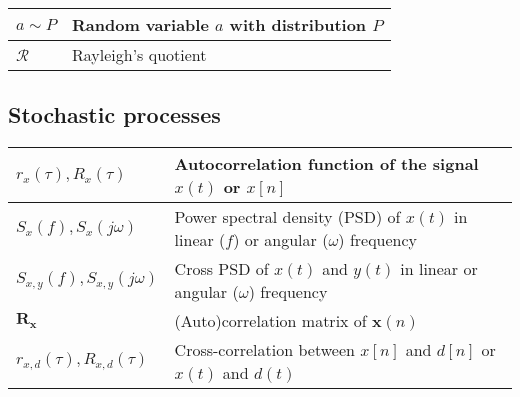 \begin{xltabular}{\textwidth}{XX}
	\(a\sim P\)                                                                                                                                  & Random variable \(a\) with distribution \(P\)                                                                                                                           \\ \hline
	\(\mathcal{R}\)                                                                                                                              & Rayleigh's quotient
\end{xltabular}
\subsection{Stochastic processes}
\begin{xltabular}{\textwidth}{XX}
	\(r_x(\tau), R_x(\tau)\)                                                                                                      & Autocorrelation function of the signal \(x(t)\) or \(x[n]\) \cite{nossekAdaptiveArraySignal2015}                                                                                                                                   \\ \hline
	\(S_x(f), S_x(j\omega)\)                                                                                                      & Power spectral density (PSD) of \(x(t)\) in linear (\(f\)) or angular (\(\omega\)) frequency                                                                                                                                       \\ \hline
	\(S_{x,y}(f), S_{x,y}(j\omega)\)                                                                                              & Cross PSD of \(x(t)\) and \(y(t)\) in linear or angular (\(\omega\)) frequency                                                                                                                                                     \\ \hline
	\(\mathbf{R}_\mathbf{x}\)                                                                                                     & (Auto)correlation matrix of \(\mathbf{x}(n)\)                                                                                                                                                                                      \\ \hline
	\(r_{x,d}(\tau), R_{x,d}(\tau)\)                                                                                              & Cross-correlation between \(x[n]\) and \(d[n]\) or \(x(t)\) and \(d(t)\) \cite{nossekAdaptiveArraySignal2015}                                                                                                                      \\ \hline

\end{xltabular}

